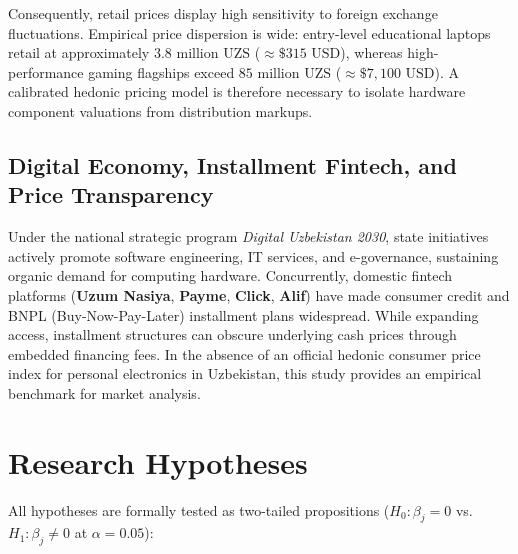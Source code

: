\documentclass[11pt, a4paper]{article}
\begin{document}
Consequently, retail prices display high sensitivity to foreign exchange fluctuations. Empirical price dispersion is wide: entry-level educational laptops retail at approximately $3.8\text{ million UZS}$ ($\approx \$315\text{ USD}$), whereas high-performance gaming flagships exceed $85\text{ million UZS}$ ($\approx \$7,100\text{ USD}$). A calibrated hedonic pricing model is therefore necessary to isolate hardware component valuations from distribution markups.

\subsection{Digital Economy, Installment Fintech, and Price Transparency}
Under the national strategic program \textit{Digital Uzbekistan 2030}, state initiatives actively promote software engineering, IT services, and e-governance, sustaining organic demand for computing hardware. Concurrently, domestic fintech platforms (\textbf{Uzum Nasiya}, \textbf{Payme}, \textbf{Click}, \textbf{Alif}) have made consumer credit and BNPL (Buy-Now-Pay-Later) installment plans widespread. While expanding access, installment structures can obscure underlying cash prices through embedded financing fees. In the absence of an official hedonic consumer price index for personal electronics in Uzbekistan, this study provides an empirical benchmark for market analysis.

\section{Research Hypotheses}

All hypotheses are formally tested as two-tailed propositions ($H_0\colon \beta_j = 0$ vs. $H_1\colon \beta_j \neq 0$ at $\alpha = 0.05$):
\end{document}
